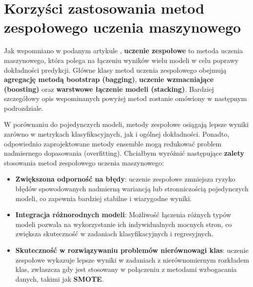 \section{Korzyści zastosowania metod zespołowego uczenia maszynowego}
Jak wspomniano w podanym artykule \cite{metoda13},
\textbf{uczenie zespołowe} to metoda uczenia maszynowego, która polega
na łączeniu wyników wielu modeli w celu poprawy dokładności predykcji. Główne klasy metod uczenia zespołowego obejmują
\textbf{agregację metodą bootstrap (bagging)}, \textbf{uczenie wzmacniające (boosting)} oraz \textbf{warstwowe łączenie modeli (stacking)}. Bardziej
szczegółowy opis wspominanych powyżej metod zostanie omówiony w
następnym podrozdziale.

W porównaniu do pojedynczych modeli, metody zespołowe osiągają lepsze
wyniki zarówno w metrykach klasyfikacyjnych, jak i ogólnej dokładności.
Ponadto, odpowiednio zaprojektowane metody ensemble mogą redukować
problem nadmiernego dopasowania (overfitting). Chciałbym wyróżnić
następujące \textbf{zalety} stosowania metod zespołowego
uczenia maszynowego:

\begin{itemize}
	\item
	      \textbf{Zwiększona odporność na błędy}: uczenie zespołowe zmniejsza
	      ryzyko błędów spowodowanych nadmierną wariancją lub stronniczością
	      pojedynczych modeli, co zapewnia bardziej stabilne i wiarygodne
	      wyniki.
	\item
	      \textbf{Integracja różnorodnych modeli}: Możliwość łączenia różnych
	      typów modeli pozwala na wykorzystanie ich indywidualnych mocnych
	      stron, co zwiększa skuteczność w zadaniach
	      klasyfikacyjnych i regresyjnych.
	\item
	      \textbf{Skuteczność w rozwiązywaniu problemów nierównowagi klas}:
	      uczenie zespołowe wykazuje lepsze wyniki w zadaniach z nierównomiernym
	      rozkładem klas, zwłaszcza gdy jest stosowany w połączeniu z metodami
	      wzbogacania danych, takimi jak \textbf{SMOTE}.
\end{itemize}
